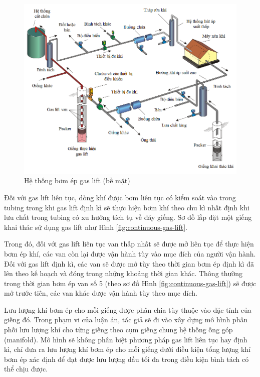 \documentclass[12pt,a4paper]{report}
\begin{document}
	\begin{figure}[h]
		\centering
		\includegraphics[scale=.6]{fig/gas-lift-system.png}
		\caption{Hệ thống bơm ép gas lift (bề mặt)}
		\label{fig:gas-lift-system}
	\end{figure}

Đối với gas lift liên tục, dòng khí được bơm liên tục có kiểm soát vào trong tubing trong khi gas lift định kì sẽ thực hiện bơm khí theo chu kì nhất định khi lưu chất trong tubing có xu hướng tích tụ về đáy giếng. Sơ đồ lắp đặt một giếng khai thác sử dụng gas lift như Hình \ref{fig:continuous-gas-lift}.

Trong đó, đối với gas lift liên tục van thấp nhất sẽ được mở liên tục để thực hiện bơm ép khí, các van còn lại được vận hành tùy vào mục đích của người vận hành. Đối với gas lift định kì, các van sẽ được mở tùy theo thời gian bơm ép định kì đã lên theo kế hoạch và đóng trong những khoảng thời gian khác. Thông thường trong thời gian bơm ép van số 5 (theo sơ đồ Hình \ref{fig:continuous-gas-lift}) sẽ được mở trước tiên, các van khác được vận hành tùy theo mục đích.

Lưu lượng khí bơm ép cho mỗi giếng được phân chia tùy thuộc vào đặc tính của giếng đó. Trong phạm vi của luận án, tác giả sẽ đi vào xây dựng mô hình phân phối lưu lượng khí cho từng giếng theo cụm giếng chung hệ thống ống góp (manifold). Mô hình sẽ không phân biệt phương pháp gas lift liên tục hay định kì, chỉ đưa ra lưu lượng khí bơm ép cho mỗi giếng dưới điều kiện tổng lượng khí bơm ép xác định để đạt được lưu lượng dầu tối đa trong điều kiện bình tách có thể chịu được.
\end{document}
